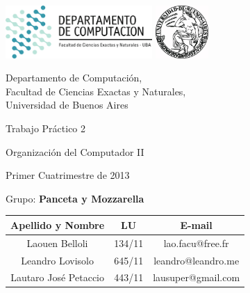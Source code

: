 \documentclass[a4paper,10pt,twoside]{article}
\begin{document}


\thispagestyle{caratula}

\begin{center}

\includegraphics[height=2cm]{DC.png} 
\hfill
\includegraphics[height=2cm]{UBA.jpg} 

\vspace{2cm}

Departamento de Computación,\\
Facultad de Ciencias Exactas y Naturales,\\
Universidad de Buenos Aires

\vspace{4cm}

\begin{Huge}
Trabajo Práctico 2
\end{Huge}

\vspace{0.5cm}

\begin{Large}
Organización del Computador II
\end{Large}

\vspace{1cm}

Primer Cuatrimestre de 2013

\vspace{4cm}

Grupo: \textbf{Panceta y Mozzarella}

\vspace{0.5cm}

\begin{tabular}{|c|c|c|}
\hline
Apellido y Nombre & LU & E-mail\\
\hline
Laouen Belloli        & 134/11 & lao.facu@free.fr\\
Leandro Lovisolo      & 645/11 & leandro@leandro.me\\
Lautaro José Petaccio & 443/11 & lausuper@gmail.com\\
\hline
\end{tabular}

\end{center}
\end{document}
